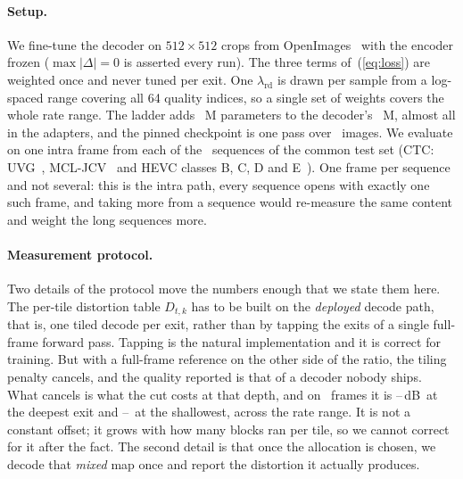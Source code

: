 \documentclass[10pt,twocolumn,letterpaper]{article}
\newcommand{\dB}{\,dB}
\begin{document}
\paragraph{Setup.} We fine-tune the decoder on $512{\times}512$ crops from
OpenImages~\cite{openimages} with the encoder frozen ($\max|\Delta| = 0$ is
asserted every run). The three terms of~(\ref{eq:loss}) are weighted once and never tuned per exit.
One $\lambda_{\mathrm{rd}}$ is drawn per sample from a
log-spaced range covering all 64 quality indices, so a single set of weights
covers the whole rate range. The ladder adds \ParamsAdapters~M parameters to
the decoder's \ParamsTotal~M, almost all in the adapters, and the pinned
checkpoint is one pass over \TrainImages\ images. We evaluate on one intra frame from each of the \NumSeq\ sequences of the
common test set (CTC: UVG~\cite{uvg}, MCL-JCV~\cite{mcljcv} and HEVC classes B,
C, D and E~\cite{hevc}). One frame per sequence and not several: this is the
intra path, every sequence opens with exactly one such frame, and taking more
from a sequence would re-measure the same content and weight the long sequences
more.

\paragraph{Measurement protocol.} Two details of the protocol move the numbers
enough that we state them here. The per-tile distortion table $D_{t,k}$ has to be
built on the \emph{deployed} decode path, that is, one tiled decode per exit,
rather than by tapping the exits of a single full-frame forward pass. Tapping is
the natural implementation and it is correct for training. But with a full-frame
reference on the other side of the ratio, the tiling penalty cancels, and the
quality reported is that of a decoder nobody ships. What cancels is what the cut
costs at that depth, and on \TileRefFrames\ frames it is
\TileRefDeepLo--\TileRefDeepHi\dB\ at the deepest exit and
\TileRefShallowLo--\TileRefShallowHi\ at the shallowest, across the rate range.
It is not a constant offset; it grows with how many blocks ran per tile, so we
cannot correct for it after the fact. The second detail is that once the allocation is chosen,
we decode that \emph{mixed} map once and report the distortion it actually
produces.
\end{document}
